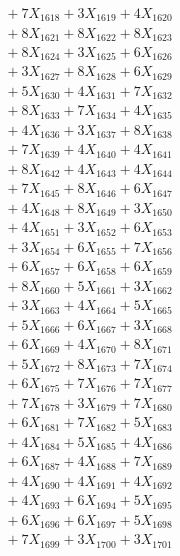 \documentclass[a4paper,10pt]{article}
\begin{document}
{\begin{align}
&\;  + 7 X_{1618} + 3 X_{1619} + 4 X_{1620} \\[0.3ex]
&\;  + 8 X_{1621} + 8 X_{1622} + 8 X_{1623} \\[0.3ex]
&\;  + 8 X_{1624} + 3 X_{1625} + 6 X_{1626} \\[0.3ex]
&\;  + 3 X_{1627} + 8 X_{1628} + 6 X_{1629} \\[0.5ex]\allowbreak
&\;  + 5 X_{1630} + 4 X_{1631} + 7 X_{1632} \\[0.3ex]
&\;  + 8 X_{1633} + 7 X_{1634} + 4 X_{1635} \\[0.3ex]
&\;  + 4 X_{1636} + 3 X_{1637} + 8 X_{1638} \\[0.3ex]
&\;  + 7 X_{1639} + 4 X_{1640} + 4 X_{1641} \\[0.3ex]
&\;  + 8 X_{1642} + 4 X_{1643} + 4 X_{1644} \\[0.3ex]
&\;  + 7 X_{1645} + 8 X_{1646} + 6 X_{1647} \\[0.3ex]
&\;  + 4 X_{1648} + 8 X_{1649} + 3 X_{1650} \\[0.3ex]
&\;  + 4 X_{1651} + 3 X_{1652} + 6 X_{1653} \\[0.3ex]
&\;  + 3 X_{1654} + 6 X_{1655} + 7 X_{1656} \\[0.3ex]
&\;  + 6 X_{1657} + 6 X_{1658} + 6 X_{1659} \\[0.5ex]\allowbreak
&\;  + 8 X_{1660} + 5 X_{1661} + 3 X_{1662} \\[0.3ex]
&\;  + 3 X_{1663} + 4 X_{1664} + 5 X_{1665} \\[0.3ex]
&\;  + 5 X_{1666} + 6 X_{1667} + 3 X_{1668} \\[0.3ex]
&\;  + 6 X_{1669} + 4 X_{1670} + 8 X_{1671} \\[0.3ex]
&\;  + 5 X_{1672} + 8 X_{1673} + 7 X_{1674} \\[0.3ex]
&\;  + 6 X_{1675} + 7 X_{1676} + 7 X_{1677} \\[0.3ex]
&\;  + 7 X_{1678} + 3 X_{1679} + 7 X_{1680} \\[0.3ex]
&\;  + 6 X_{1681} + 7 X_{1682} + 5 X_{1683} \\[0.3ex]
&\;  + 4 X_{1684} + 5 X_{1685} + 4 X_{1686} \\[0.3ex]
&\;  + 6 X_{1687} + 4 X_{1688} + 7 X_{1689} \\[0.5ex]\allowbreak
&\;  + 4 X_{1690} + 4 X_{1691} + 4 X_{1692} \\[0.3ex]
&\;  + 4 X_{1693} + 6 X_{1694} + 5 X_{1695} \\[0.3ex]
&\;  + 6 X_{1696} + 6 X_{1697} + 5 X_{1698} \\[0.3ex]
&\;  + 7 X_{1699} + 3 X_{1700} + 3 X_{1701} \\[0.3ex]

\end{align}}
\end{document}
